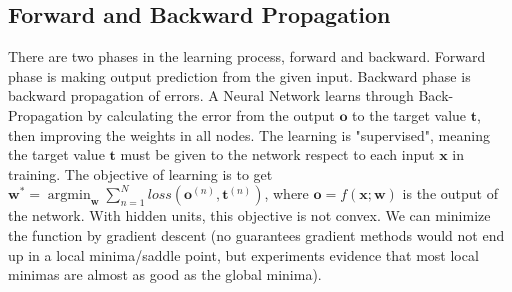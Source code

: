 \newcommand{\argminE}{\mathop{\mathrm{argmin}}}  

\subsection{Forward and Backward Propagation}
There are two phases in the learning process, forward and backward. Forward phase is making output prediction from the given input.
Backward phase is backward propagation of errors. A Neural Network learns through Back-Propagation by calculating the error from the output $\mathbf{o}$ to the target value $\mathbf{t}$, then improving the weights in all nodes. The learning is "supervised", meaning the target value $\mathbf{t}$ must be given to the network respect to each input  $\mathbf{x}$ in training. The objective of learning is to get $\mathbf{w}^* = \argminE_\mathbf{w} \sum_{n=1}^N loss(\mathbf{o}^{(n)},\mathbf{t}^{(n)})$, where $\mathbf{o} = f(\mathbf{x};\mathbf{w})$ is the output of the network. With hidden units, this objective is not convex. We can minimize the function by gradient descent (no guarantees gradient methods would not end up in a local minima/saddle point, but experiments evidence that most local minimas are almost as good as the global minima).


